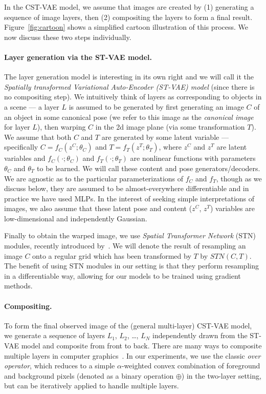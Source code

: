  In the CST-VAE model, we assume that images are created by (1) generating a sequence of image layers,
 then (2) compositing the layers to form a final result.  Figure~\ref{fig:cartoon} shows a simplified cartoon illustration of this process.  
 We now discuss these two steps individually.
 \vspace{-1mm}
 \paragraph{Layer generation via the ST-VAE model.}
 The layer generation model is interesting in its own right and we will call it the \emph{Spatially transformed 
 Variational Auto-Encoder (ST-VAE) model} (since there is no compositing step).
 We intuitively think of  layers as corresponding to objects in a scene --- a layer $L$ is assumed 
 to be generated by first generating an image $C$ of an object in some canonical pose (we refer to this image as
 the \emph{canonical image} for layer $L$), then warping $C$ in the 2d image plane (via some transformation $T$).
We assume that both $C$ and $T$ are generated by some latent variable --- specifically $C = f_C(z^C; \theta_C)$ and $T = f_T(z^T; \theta_T)$,
where $z^C$ and $z^T$ are latent variables and $f_C(\cdot; \theta_C)$ and $f_T(\cdot; \theta_T)$ are nonlinear functions with parameters
$\theta_C$ and $\theta_T$ to be learned.  We will call these content
and pose generators/decoders.
We are agnostic as to the particular parameterizations of $f_C$ and $f_T$, though as we discuss below, they
are assumed to be almost-everywhere differentiable and in practice we
have used MLPs.
In the interest of seeking simple interpretations of images, we also assume that these latent pose and content ($z^C$, $z^T$) 
variables are low-dimensional and independently Gaussian.

Finally to obtain the warped image, we
use \emph{Spatial Transformer Network} (STN) modules, recently introduced by~\cite{jaderberg2015spatial}.
We will denote  the result of resampling an image $C$ onto a regular grid which has been transformed by $T$ by $STN(C, T)$.
The benefit of using STN modules in our setting 
is that they perform resampling in a differentiable way, allowing for our models to be trained using gradient methods.
 \vspace{-1mm}
\paragraph{Compositing.}
To form the final observed image of the (general multi-layer) CST-VAE model, we generate a sequence of layers $L_1$, $L_2$, \dots, $L_N$
independently drawn from the ST-VAE model and composite from
front to back.
There are many  ways to composite multiple layers in computer graphics~\citep{porter1984compositing}.
In our experiments, we use  the classic \emph{over operator}, which reduces to a simple $\alpha$-weighted
convex combination of foreground and background pixels (denoted as a  binary  operation $\oplus$)
in the two-layer setting, but can be iteratively applied
to handle multiple layers. %

